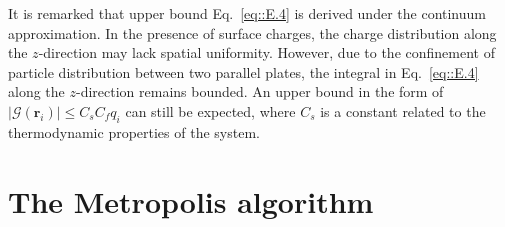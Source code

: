 It is remarked that upper bound Eq.~\eqref{eq::E.4} is derived under the continuum approximation. In the presence of surface charges, the charge distribution along the $z$-direction may lack spatial uniformity. However, due to the confinement of particle distribution between two parallel plates, the integral in Eq.~\eqref{eq::E.4} along the $z$-direction remains bounded. An upper bound in the form of $|\mathscr{G}(\bm{r}_i)|\leq C_s C_{f}q_i$ can still be expected, where $C_s$ is a constant related to the thermodynamic properties of the system.



\section{The Metropolis algorithm} \label{app::Metropolis}

